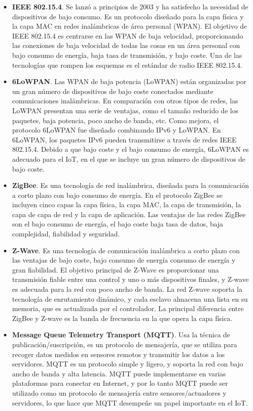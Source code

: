 {\begin{itemize}
    \item \textbf{IEEE 802.15.4}. Se lanzó a principios de 2003 y ha satisfecho la necesidad de dispositivos de bajo consumo. Es un protocolo diseñado para la capa física y la capa MAC en redes inalámbricas de área personal (WPAN). El objetivo de IEEE 802.15.4 es centrarse en las WPAN de baja velocidad, proporcionando las conexiones de baja velocidad de todas las cosas en un área personal con bajo consumo de energía, baja tasa de transmisión, y bajo coste. Una de las tecnologías que rompen los esquemas es el estándar de radio IEEE 802.15.4. \cite{8320780}
    \item \textbf{6LoWPAN}. Las WPAN de baja potencia (LoWPAN) están organizadas por un gran número de dispositivos de bajo coste conectados mediante comunicaciones inalámbricas. En comparación con otros tipos de redes, las LoWPAN presentan una serie de ventajas, como el tamaño reducido de los paquetes, baja potencia, poco ancho de banda, etc. Como mejora, el protocolo 6LoWPAN fue diseñado combinando IPv6 y LoWPAN. En 6LoWPAN, los paquetes IPv6 pueden transmitirse a través de redes IEEE 802.15.4. Debido a que bajo coste y el bajo consumo de energía, 6LoWPAN es adecuado para el IoT, en el que se incluye un gran número de dispositivos de bajo coste.
    \item \textbf{ZigBee}. Es una tecnología de red inalámbrica, diseñada para la comunicación a corto plazo con bajo consumo de energía. En el protocolo ZigBee se incluyen cinco capas la capa física, la capa MAC, la capa de transmisión, la capa de capa de red y la capa de aplicación. Las ventajas de las redes ZigBee son el bajo consumo de energía, el bajo coste baja tasa de datos, baja complejidad, fiabilidad y seguridad.
    \item \textbf{Z-Wave}. Es una tecnología de comunicación inalámbrica a corto plazo con las ventajas de bajo coste, bajo consumo de energía consumo de energía y gran fiabilidad. El objetivo principal de Z-Wave es proporcionar una transmisión fiable entre una control y uno o más dispositivos finales, y Z-wave es adecuada para la red con poco ancho de banda. La red Z-wave soporta la tecnología de enrutamiento dinámico, y cada esclavo almacena una lista en su memoria, que es actualizada por el controlador. La principal diferencia entre ZigBee y Z-wave es la banda de frecuencia en la que opera la capa física.
    \item \textbf{Message Queue Telemetry Transport (MQTT)}. Usa la técnica de publicación/suscripción, es un protocolo de mensajería, que se utiliza para recoger datos medidos en sensores remotos y transmitir los datos a los servidores. MQTT es un protocolo simple y ligero, y soporta la red con bajo ancho de banda y alta latencia. MQTT puede implementarse en varias plataformas para conectar en Internet, y por lo tanto MQTT puede ser utilizado como un protocolo de mensajería entre sensores/actuadores y servidores, lo que hace que MQTT desempeñe un papel importante en el IoT.

\end{itemize}}
